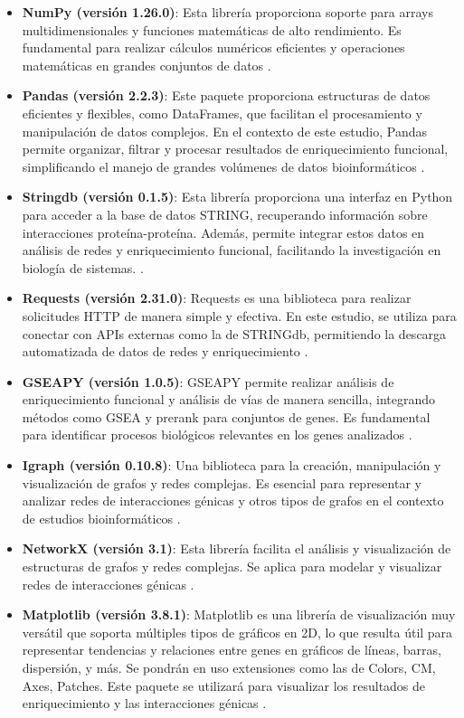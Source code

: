 \begin{itemize}
	\item \textbf{NumPy (versión 1.26.0)}: Esta librería proporciona soporte para arrays multidimensionales y funciones matemáticas de alto rendimiento. Es fundamental para realizar cálculos numéricos eficientes y operaciones matemáticas en grandes conjuntos de datos \cite{numpy}.
	\item \textbf{Pandas (versión 2.2.3)}: Este paquete proporciona estructuras de datos eficientes y flexibles, como DataFrames, que facilitan el procesamiento y manipulación de datos complejos. En el contexto de este estudio, Pandas permite organizar, filtrar y procesar resultados de enriquecimiento funcional, simplificando el manejo de grandes volúmenes de datos bioinformáticos \cite{pandas}.
	\item \textbf{Stringdb (versión 0.1.5)}: Esta librería proporciona una interfaz en Python para acceder a la base de datos STRING, recuperando información sobre interacciones proteína-proteína. Además, permite integrar estos datos en análisis de redes y enriquecimiento funcional, facilitando la investigación en biología de sistemas. \cite{stringdb}.
	\item \textbf{Requests (versión 2.31.0)}: Requests es una biblioteca para realizar solicitudes HTTP de manera simple y efectiva. En este estudio, se utiliza para conectar con APIs externas como la de STRINGdb, permitiendo la descarga automatizada de datos de redes y enriquecimiento \cite{requests}.
	\item \textbf{GSEAPY (versión 1.0.5)}: GSEAPY permite realizar análisis de enriquecimiento funcional y análisis de vías de manera sencilla, integrando métodos como GSEA y prerank para conjuntos de genes. Es fundamental para identificar procesos biológicos relevantes en los genes analizados \cite{gseapy}.
	\item \textbf{Igraph (versión 0.10.8)}: Una biblioteca para la creación, manipulación y visualización de grafos y redes complejas. Es esencial para representar y analizar redes de interacciones génicas y otros tipos de grafos en el contexto de estudios bioinformáticos \cite{igraph}.
	\item \textbf{NetworkX (versión 3.1)}: Esta librería facilita el análisis y visualización de estructuras de grafos y redes complejas. Se aplica para modelar y visualizar redes de interacciones génicas \cite{networkx}.
	\item \textbf{Matplotlib (versión 3.8.1)}: Matplotlib es una librería de visualización muy versátil que soporta múltiples tipos de gráficos en 2D, lo que resulta útil para representar tendencias y relaciones entre genes en gráficos de líneas, barras, dispersión, y más. Se pondrán en uso extensiones como las de Colors, CM, Axes, Patches. Este paquete se utilizará para visualizar los resultados de enriquecimiento y las interacciones génicas \cite{matplotlib}.

\end{itemize}
